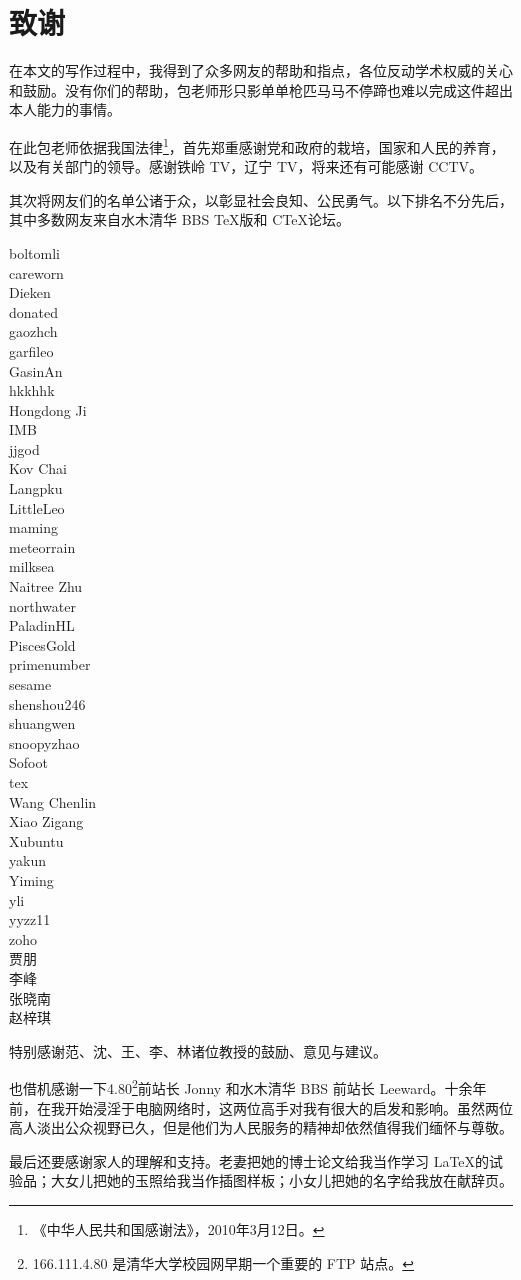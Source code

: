 \chapter{致谢}

在本文的写作过程中，我得到了众多网友的帮助和指点，各位反动学术权威的关心和鼓励。没有你们的帮助，包老师形只影单单枪匹马马不停蹄也难以完成这件超出本人能力的事情。

在此包老师依据我国法律\footnote{《中华人民共和国感谢法》，2010年3月12日。}，首先郑重感谢党和政府的栽培，国家和人民的养育，以及有关部门的领导。感谢铁岭 TV，辽宁 TV，将来还有可能感谢 CCTV。

其次将网友们的名单公诸于众，以彰显社会良知、公民勇气。以下排名不分先后，其中多数网友来自水木清华 BBS \TeX 版和 C\TeX 论坛。

\begin{multicols}{3}
\noindent
boltomli\\
careworn\\
Dieken\\
donated\\
gaozhch\\
garfileo\\
GasinAn\\
hkkhhk\\
Hongdong Ji\\
IMB\\
jjgod\\
Kov Chai\\
Langpku\\
LittleLeo\\
maming\\
meteorrain\\
milksea\\
Naitree Zhu\\
northwater\\
PaladinHL\\
PiscesGold\\
primenumber\\
sesame\\
shenshou246\\
shuangwen\\
snoopyzhao\\
Sofoot\\
tex\\
Wang Chenlin\\
Xiao Zigang\\
Xubuntu\\
yakun\\
Yiming\\
yli\\
yyzz11\\
zoho\\
贾朋\\
李峰\\
张晓南\\
赵梓琪
\end{multicols}

特别感谢范、沈、王、李、林诸位教授的鼓励、意见与建议。

也借机感谢一下4.80\footnote{166.111.4.80 是清华大学校园网早期一个重要的 FTP 站点。}前站长 Jonny 和水木清华 BBS 前站长 Leeward。十余年前，在我开始浸淫于电脑网络时，这两位高手对我有很大的启发和影响。虽然两位高人淡出公众视野已久，但是他们为人民服务的精神却依然值得我们缅怀与尊敬。

最后还要感谢家人的理解和支持。老妻把她的博士论文给我当作学习 \LaTeX 的试验品；大女儿把她的玉照给我当作插图样板；小女儿把她的名字给我放在献辞页。
